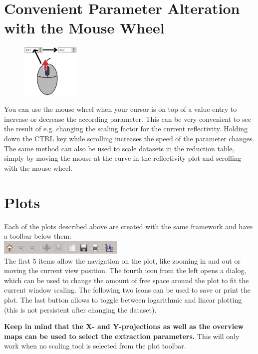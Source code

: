 \section{Convenient Parameter Alteration with the Mouse Wheel}
    \begin{figure}
        \includegraphics[width=0.25\textwidth]{screenshots/parameter_scroll.png}
    \end{figure}

  You can use the mouse wheel when your cursor is on top of a value entry to increase or decrease the according parameter. 
  This can be very convenient to see the result of e.g. changing the scaling factor for the current reflectivity. Holding down the CTRL key while scrolling increases the speed of the parameter changes.
  The same method can also be used to scale datasets in the reduction table, simply by moving the mouse at the curve in the reflectivity plot and scrolling with the mouse wheel.
  
\section{Plots}
  Each of the plots described above are created with the same framework and have a toolbar below them:\\
  \includegraphics[width=6cm]{screenshots/plottoolbar.png}\\
  The first 5 items allow the navigation on the plot, like zooming in and out or moving the current view position.
  The fourth icon from the left opens a dialog, which can be used to change the amount of free space around the plot to fit the current window scaling.
  The following two icons can be used to save or print the plot. The last button allows to toggle between logarithmic and linear plotting (this is not persistent after changing the dataset).
  
  \textbf{Keep in mind that the X- and Y-projections as well as the overview maps can be used to select the extraction parameters.}
  This will only work when no scaling tool is selected from the plot toolbar.

